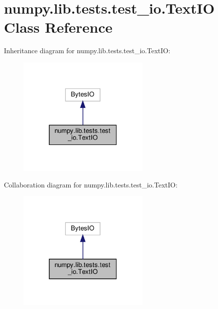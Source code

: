 \hypertarget{classnumpy_1_1lib_1_1tests_1_1test__io_1_1TextIO}{}\section{numpy.\+lib.\+tests.\+test\+\_\+io.\+Text\+IO Class Reference}
\label{classnumpy_1_1lib_1_1tests_1_1test__io_1_1TextIO}


Inheritance diagram for numpy.\+lib.\+tests.\+test\+\_\+io.\+Text\+IO\+:
\nopagebreak
\begin{figure}[H]
\begin{center}
\leavevmode
\includegraphics[width=183pt]{classnumpy_1_1lib_1_1tests_1_1test__io_1_1TextIO__inherit__graph}
\end{center}
\end{figure}


Collaboration diagram for numpy.\+lib.\+tests.\+test\+\_\+io.\+Text\+IO\+:
\nopagebreak
\begin{figure}[H]
\begin{center}
\leavevmode
\includegraphics[width=183pt]{classnumpy_1_1lib_1_1tests_1_1test__io_1_1TextIO__coll__graph}
\end{center}
\end{figure}
